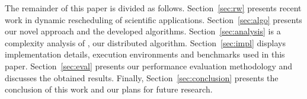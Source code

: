 The remainder of this paper is divided as follows.
Section~\ref{sec:rw} presents recent work in dynamic rescheduling of scientific applications. 
Section~\ref{sec:algo} presents our novel approach and the developed algorithms. 
Section~\ref{sec:analysis} is a complexity analysis of \packdrop, our distributed algorithm. 
Section~\ref{sec:impl} displays implementation details, execution environments and benchmarks used in this paper. 
Section~\ref{sec:eval} presents our performance evaluation methodology and discusses the obtained results. 
Finally, Section~\ref{sec:conclusion} presents the conclusion of this work and our plans for future research.


